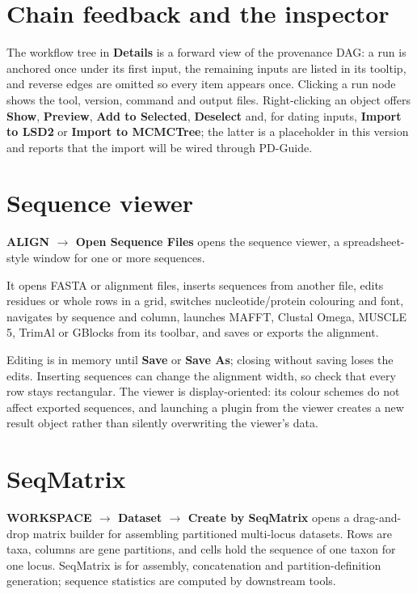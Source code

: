 \documentclass[10pt]{report}
\begin{document}
\section{Chain feedback and the inspector}

The workflow tree in \textbf{Details} is a forward view of the provenance DAG:
a run is anchored once under its first input, the remaining inputs are listed
in its tooltip, and reverse edges are omitted so every item appears once.
Clicking a run node shows the tool, version, command and output files.
Right-clicking an object offers \textbf{Show}, \textbf{Preview}, \textbf{Add to
Selected}, \textbf{Deselect} and, for dating inputs, \textbf{Import to LSD2}
or \textbf{Import to MCMCTree}; the latter is a placeholder in this version
and reports that the import will be wired through PD-Guide.

\section{Sequence viewer}

\textbf{ALIGN $\rightarrow$ Open Sequence Files} opens the sequence viewer, a
spreadsheet-style window for one or more sequences.

It opens FASTA or alignment files, inserts sequences from another file, edits
residues or whole rows in a grid, switches nucleotide/protein colouring and
font, navigates by sequence and column, launches MAFFT, Clustal Omega, MUSCLE
5, TrimAl or GBlocks from its toolbar, and saves or exports the alignment.

Editing is in memory until \textbf{Save} or \textbf{Save As}; closing without
saving loses the edits. Inserting sequences can change the alignment width, so
check that every row stays rectangular. The viewer is display-oriented: its
colour schemes do not affect exported sequences, and launching a plugin from
the viewer creates a new result object rather than silently overwriting the
viewer's data.

\section{SeqMatrix}

\textbf{WORKSPACE $\rightarrow$ Dataset $\rightarrow$ Create by SeqMatrix}
opens a drag-and-drop matrix builder for assembling partitioned multi-locus
datasets. Rows are taxa, columns are gene partitions, and cells hold the
sequence of one taxon for one locus. SeqMatrix is for assembly, concatenation
and partition-definition generation; sequence statistics are computed by
downstream tools.
\end{document}
